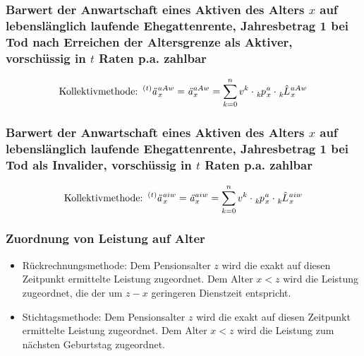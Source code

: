 \documentclass[12pt]{report}
\theoremstyle{dotless}
\theoremstyle{definition}
\begin{document}
\subsubsection{Barwert der Anwartschaft eines Aktiven des Alters $x$ auf lebenslänglich laufende Ehegattenrente, Jahresbetrag 1 bei Tod nach Erreichen der Altersgrenze als Aktiver, vorschüssig in $t$ Raten p.a. zahlbar}
\begin{equation}
	\text{Kollektivmethode: } \tensor[^{(t)}]{\text{\textit{ä}}}{}_x^{aAw}=\text{\textit{ä}}_x^{aAw}=\sum_{k = 0}^n v^k \cdot \tensor[_{k}]{p}{}_x^a \cdot \tensor[_{k}]{\hat{L}}{}_x^{aAw}
\end{equation}

\subsubsection{Barwert der Anwartschaft eines Aktiven des Alters $x$ auf lebenslänglich laufende Ehegattenrente, Jahresbetrag 1 bei Tod als Invalider, vorschüssig in $t$ Raten p.a. zahlbar}
\begin{equation}
	\text{Kollektivmethode: } \tensor[^{(t)}]{\text{\textit{ä}}}{}_x^{aiw}=\text{\textit{ä}}_x^{aiw}=\sum_{k = 0}^n v^k \cdot \tensor[_{k}]{p}{}_x^a \cdot \tensor[_{k}]{\hat{L}}{}_x^{aiw}
\end{equation}

\subsubsection{Zuordnung von Leistung auf Alter}
\begin{itemize}
	\item Rückrechnungsmethode: Dem Pensionsalter $z$ wird die exakt auf diesen Zeitpunkt ermittelte Leistung zugeordnet. Dem Alter $x<z$ wird die Leistung zugeordnet, die der um $z-x$ geringeren Dienstzeit entspricht.
	\item Stichtagsmethode: Dem Pensionsalter $z$ wird die exakt auf diesen Zeitpunkt ermittelte Leistung zugeordnet. Dem Alter $x<z$ wird die Leistung zum nächsten Geburtstag zugeordnet.
\end{itemize}
\end{document}
